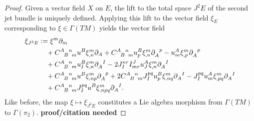 \begin{proof}
  Given a vector field $X$ on $E$, the lift to the total space $J^2E$ of the second jet bundle is uniquely defined\cite{Saunders_1989}. Applying this lift to the vector field $\xi_E$ corresponding to $\xi\in \Gamma(TM)$ yields the vector field
  \begin{equation}\label{vector_field_2nd_prolongation}
    \begin{aligned}
      \xi_{J^2E} &{} \vcentcolon= \xi^m\partial_m \\
                 &{} \hphantom{\vcentcolon=} + \gmc{A}{B}{n}{m} u^B \xi^m_{,n}\partial_A + \gmc{A}{B}{n}{m} u^B_p\xi^m_{,n}\partial_A^{\hphantom Ap} - u^A_m\xi^m_{,p}\partial_A^{\hphantom Ap} \\
                 &{} \hphantom{\vcentcolon=} + \gmc{A}{B}{n}{m} u^B_I \xi^m_{,n} \partial_A^{\hphantom AI} - 2 J_I^{nr}I^J_{mr}u^A_J\xi^m_{,n}\partial_A^{\hphantom AI} \\
                 &{} \hphantom{\vcentcolon=} + \gmc{A}{B}{n}{m} u^B \xi^m_{,np} \partial_A^{\hphantom Ap} + 2 \gmc{A}{B}{n}{m} J_I^{pq} u^B_p \xi^m_{,nq} \partial_A^{\hphantom AI} - J_I^{pq} u^A_m \xi^m_{,pq} \partial_A^{\hphantom AI} \\
                 &{} \hphantom{\vcentcolon=} + \gmc{A}{B}{n}{m} J_I^{pq} u^B \xi^m_{,npq} \partial_A^{\hphantom AI}.
    \end{aligned}
  \end{equation}
  Like before, the map $\xi\mapsto\xi_{J^2E}$ constitutes a Lie algebra morphism from $\Gamma(TM)$ to $\Gamma(\pi_2)$. \textbf{proof/citation needed}


\end{proof}
